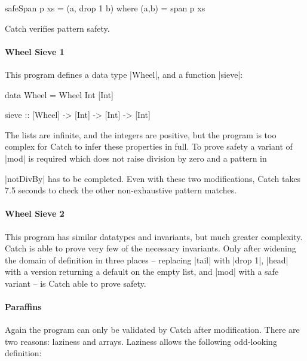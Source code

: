 \begin{code}
safeSpan p xs = (a, drop 1 b) where (a,b) = span p xs
\end{code}

\noindent Catch verifies pattern safety.

\paragraph{Wheel Sieve 1}

This program defines a data type |Wheel|, and a function |sieve|:

\pagebreak[3]
\begin{code}
data Wheel = Wheel Int [Int]

sieve :: [Wheel] -> [Int] -> [Int] -> [Int]
\end{code}

The lists are infinite, and the integers are positive, but the program is too complex for Catch to infer these properties in full. To prove safety a variant of |mod| is required which does not raise division by zero and a pattern in \ignore|notDivBy| has to be completed. Even with these two modifications, Catch takes 7.5 seconds to check the other non-exhaustive pattern matches.


\paragraph{Wheel Sieve 2}

This program has similar datatypes and invariants, but much greater complexity. Catch is able to prove very few of the necessary invariants. Only after widening the domain of definition in three places -- replacing |tail| with |drop 1|, |head| with a version returning a default on the empty list, and |mod| with a safe variant -- is Catch able to prove safety.


\paragraph{Paraffins}

Again the program can only be validated by Catch after modification. There are two reasons: laziness and arrays. Laziness allows the following odd-looking definition:

\begin{comment}
\begin{code}
big_memory_computation = undefined
\end{code}
\end{comment}

